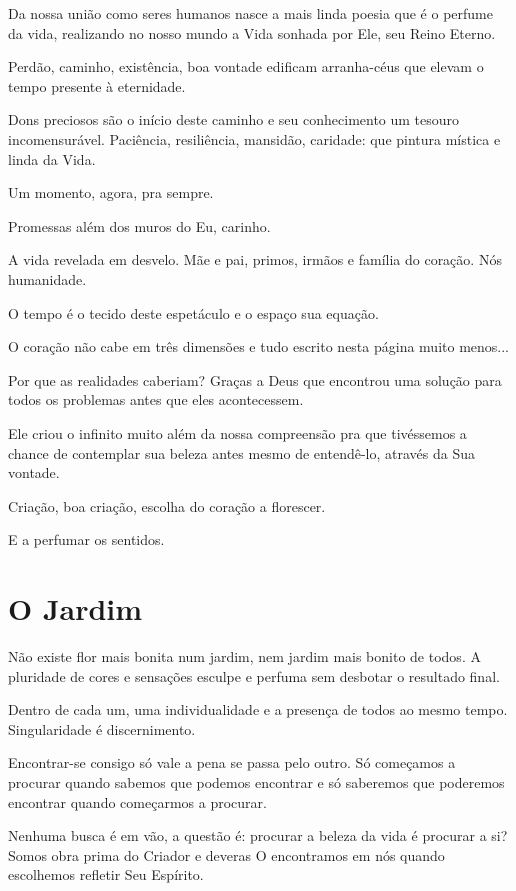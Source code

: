 Da nossa união como seres humanos nasce a mais linda poesia que é o perfume da vida, realizando no nosso mundo a Vida sonhada por Ele, seu Reino Eterno. 

Perdão, caminho, existência, boa vontade edificam arranha-céus que elevam o tempo presente à eternidade. 

Dons preciosos são o início deste caminho e seu conhecimento um tesouro incomensurável. Paciência, resiliência, mansidão, caridade: que pintura mística e linda da Vida. 

Um momento, agora, pra sempre. 

Promessas além dos muros do Eu, carinho. 

A vida revelada em desvelo. Mãe e pai, primos, irmãos e família do coração. Nós humanidade. 

O tempo é o tecido deste espetáculo e o espaço sua equação.  

O coração não cabe em três dimensões e tudo escrito nesta página muito menos... 

Por que as realidades caberiam? Graças a Deus que encontrou uma solução para todos os problemas antes que eles acontecessem. 

Ele criou o infinito muito além da nossa compreensão pra que tivéssemos a chance de contemplar sua beleza antes mesmo de entendê-lo, através da Sua vontade. 

Criação, boa criação, escolha do coração a florescer. 

E a perfumar os sentidos. 

\section{O Jardim}

Não existe flor mais bonita num jardim, nem jardim mais bonito de todos. A pluridade de cores e sensações esculpe e perfuma sem desbotar o resultado final. 

Dentro de cada um, uma individualidade e a presença de todos ao mesmo tempo. Singularidade é discernimento. 

Encontrar-se consigo só vale a pena se passa pelo outro. Só começamos a procurar quando sabemos que podemos encontrar e só saberemos que poderemos encontrar quando começarmos a procurar. 

Nenhuma busca é em vão, a questão é: procurar a beleza da vida é procurar a si? Somos obra prima do Criador e deveras O encontramos em nós quando escolhemos refletir Seu Espírito. 

